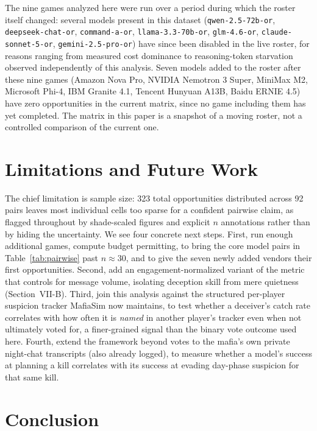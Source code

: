 \documentclass[10pt,conference]{IEEEtran}
\begin{document}
The nine games analyzed here were run over a period during which the roster itself changed: several models present in this dataset (\texttt{qwen-2.5-72b-or}, \texttt{deepseek-chat-or}, \texttt{command-a-or}, \texttt{llama-3.3-70b-or}, \texttt{glm-4.6-or}, \texttt{claude-sonnet-5-or}, \texttt{gemini-2.5-pro-or}) have since been disabled in the live roster, for reasons ranging from measured cost dominance to reasoning-token starvation observed independently of this analysis. Seven models added to the roster after these nine games (Amazon Nova Pro, NVIDIA Nemotron 3 Super, MiniMax M2, Microsoft Phi-4, IBM Granite 4.1, Tencent Hunyuan A13B, Baidu ERNIE 4.5) have zero opportunities in the current matrix, since no game including them has yet completed. The matrix in this paper is a snapshot of a moving roster, not a controlled comparison of the current one.

\section{Limitations and Future Work}

The chief limitation is sample size: 323 total opportunities distributed across 92 pairs leaves most individual cells too sparse for a confident pairwise claim, as flagged throughout by shade-scaled figures and explicit $n$ annotations rather than by hiding the uncertainty. We see four concrete next steps. First, run enough additional games, compute budget permitting, to bring the core model pairs in Table~\ref{tab:pairwise} past $n{\approx}30$, and to give the seven newly added vendors their first opportunities. Second, add an engagement-normalized variant of the metric that controls for message volume, isolating deception skill from mere quietness (Section~VII-B). Third, join this analysis against the structured per-player suspicion tracker MafiaSim now maintains, to test whether a deceiver's catch rate correlates with how often it is \textit{named} in another player's tracker even when not ultimately voted for, a finer-grained signal than the binary vote outcome used here. Fourth, extend the framework beyond votes to the mafia's own private night-chat transcripts (also already logged), to measure whether a model's success at planning a kill correlates with its success at evading day-phase suspicion for that same kill.

\section{Conclusion}
\end{document}
